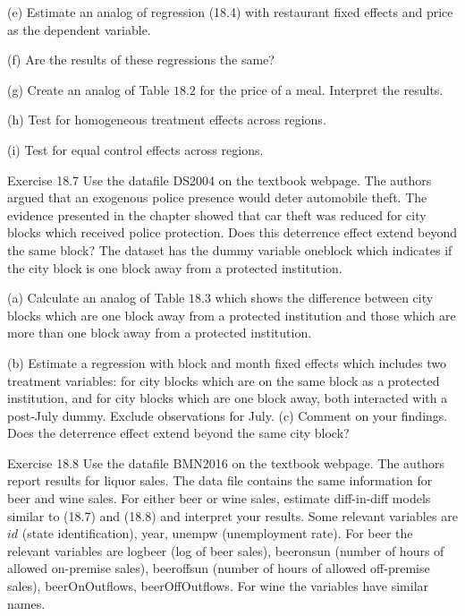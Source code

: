 \documentclass[10pt]{article}
\begin{document}
(e) Estimate an analog of regression (18.4) with restaurant fixed effects and price as the dependent variable.

(f) Are the results of these regressions the same?

(g) Create an analog of Table $18.2$ for the price of a meal. Interpret the results.

(h) Test for homogeneous treatment effects across regions.

(i) Test for equal control effects across regions.

Exercise 18.7 Use the datafile DS2004 on the textbook webpage. The authors argued that an exogenous police presence would deter automobile theft. The evidence presented in the chapter showed that car theft was reduced for city blocks which received police protection. Does this deterrence effect extend beyond the same block? The dataset has the dummy variable oneblock which indicates if the city block is one block away from a protected institution.

(a) Calculate an analog of Table $18.3$ which shows the difference between city blocks which are one block away from a protected institution and those which are more than one block away from a protected institution.

(b) Estimate a regression with block and month fixed effects which includes two treatment variables: for city blocks which are on the same block as a protected institution, and for city blocks which are one block away, both interacted with a post-July dummy. Exclude observations for July. (c) Comment on your findings. Does the deterrence effect extend beyond the same city block?

Exercise 18.8 Use the datafile BMN2016 on the textbook webpage. The authors report results for liquor sales. The data file contains the same information for beer and wine sales. For either beer or wine sales, estimate diff-in-diff models similar to (18.7) and (18.8) and interpret your results. Some relevant variables are $i d$ (state identification), year, unempw (unemployment rate). For beer the relevant variables are logbeer (log of beer sales), beeronsun (number of hours of allowed on-premise sales), beeroffsun (number of hours of allowed off-premise sales), beerOnOutflows, beerOffOutflows. For wine the variables have similar names.
\end{document}
